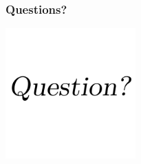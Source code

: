 \documentclass{beamer}
\begin{document}
\begin{frame}
    \frametitle{Questions?}

    \begin{center}

    \includegraphics[height=5cm]{./pics/question.pdf}

    \end{center}

\end{frame}
\end{document}
